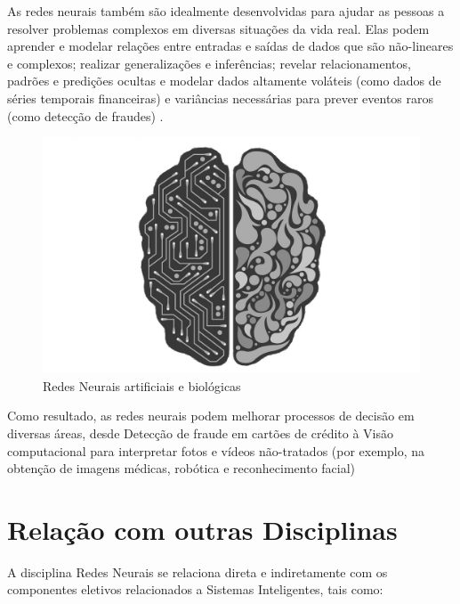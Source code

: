 \documentclass{article}
\begin{document}
As redes neurais também são idealmente desenvolvidas para ajudar as pessoas a resolver problemas complexos em diversas situações da vida real. Elas podem aprender e modelar relações entre entradas e saídas de dados que são não-lineares e complexos; realizar generalizações e inferências; revelar relacionamentos, padrões e predições ocultas e modelar dados altamente voláteis (como dados de séries temporais financeiras) e variâncias necessárias para prever eventos raros (como detecção de fraudes) . \citep{importance}

\begin{figure}[h]
\centering
\includegraphics[scale=0.2]{brain}
\caption{Redes Neurais artificiais e biológicas\citep{figure2}}
\label{figura_2}
\end{figure}

Como resultado, as redes neurais podem melhorar processos de decisão em diversas áreas, desde Detecção de fraude em cartões de crédito à Visão computacional para interpretar fotos e vídeos não-tratados (por exemplo, na obtenção de imagens médicas, robótica e reconhecimento facial)


\section{Relação com outras Disciplinas}

A disciplina Redes Neurais se relaciona direta e indiretamente com os componentes eletivos relacionados a Sistemas Inteligentes, tais como:
\end{document}
